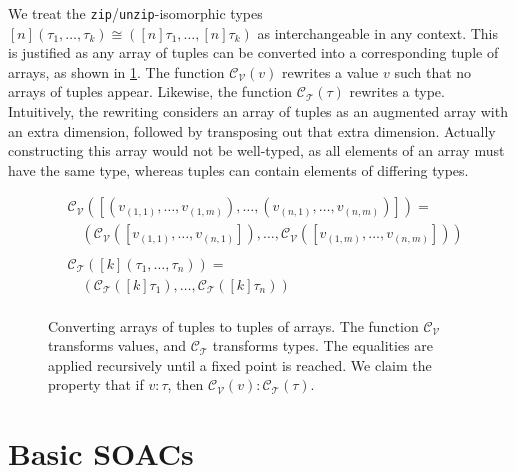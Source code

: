 \newcommand{\convV}{\mathcal{C}_{\mathcal{V}}}
\newcommand{\convT}{\mathcal{C}_{\mathcal{T}}}

We treat the \texttt{zip}/\texttt{unzip}-isomorphic types
$[n](\tau_1, \ldots, \tau_k) \cong ([n]\tau_1 , \ldots , [n]\tau_k)$ as
interchangeable in any context.  This is justified as any array of
tuples can be converted into a corresponding tuple of arrays, as shown
in \cref{fig:calc-tuple-transform}.  The function $\convV(v)$
rewrites a value $v$ such that no arrays of tuples appear.  Likewise,
the function $\convT(\tau)$ rewrites a type.  Intuitively, the
rewriting considers an array of tuples as an augmented array with an
extra dimension, followed by transposing out that extra dimension.
Actually constructing this array would not be well-typed, as all
elements of an array must have the same type, whereas tuples can
contain elements of differing types.

\begin{figure}
  \centering
  \begin{align*}
    &\convV([(v_{(1,1)}, \ldots, v_{(1,m)}),\ldots,(v_{(n,1)}, \ldots, v_{(n,m)})]) =\\
    &\quad (\convV([v_{(1,1)},\ldots,v_{(n,1)}]),\ldots,\convV([v_{(1,m)},\ldots,v_{(n,m)}]))\\
    \\
    &\convT([k](\tau_{1},\ldots,\tau_{n})) =\\
    &\quad(\convT([k]\tau_{1}),\ldots,\convT([k]\tau_{n})) \\
  \end{align*}
  \caption{Converting arrays of tuples to tuples of arrays.  The
    function $\convV$ transforms values, and $\convT$ transforms
    types.  The equalities are applied recursively until a fixed point
    is reached.  We claim the property that if $v : \tau$, then
    $\convV(v) : \convT(\tau)$.}
  \label{fig:calc-tuple-transform}
\end{figure}

\section{Basic SOACs}

